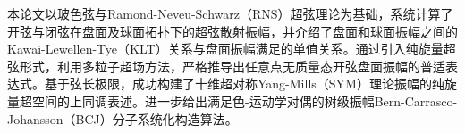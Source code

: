 
本论文以玻色弦与Ramond-Neveu-Schwarz（RNS）超弦理论为基础，系统计算了开弦与闭弦在盘面及球面拓扑下的超弦散射振幅，并介绍了盘面和球面振幅之间的Kawai-Lewellen-Tye（KLT）关系与盘面振幅满足的单值关系。通过引入纯旋量超弦形式，利用多粒子超场方法，严格推导出任意点无质量态开弦盘面振幅的普适表达式。基于弦长极限，成功构建了十维超对称Yang-Mills（SYM）理论振幅的纯旋量超空间的上同调表述。进一步给出满足色-运动学对偶的树级振幅Bern-Carrasco-Johansson（BCJ）分子系统化构造算法。
